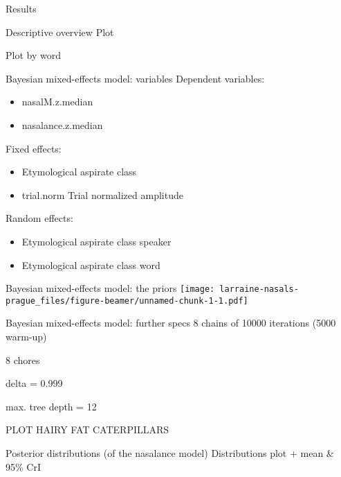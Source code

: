 \documentclass[
  ignorenonframetext,
]{beamer}
\begin{document}
\begin{frame}{Results}
\protect\hypertarget{results}{}
\begin{block}{Descriptive overview}
\protect\hypertarget{descriptive-overview}{}
Plot

Plot by word
\end{block}

\begin{block}{Bayesian mixed-effects model: variables}
\protect\hypertarget{bayesian-mixed-effects-model-variables}{}
Dependent variables:

\begin{itemize}
\item
  nasalM.z.median
\item
  nasalance.z.median
\end{itemize}

Fixed effects:

\begin{itemize}
\item
  Etymological aspirate class
\item
  trial.norm Trial normalized amplitude
\end{itemize}

Random effects:

\begin{itemize}
\item
  Etymological aspirate class \textbar{} speaker
\item
  Etymological aspirate class \textbar{} word
\end{itemize}
\end{block}

\begin{block}{Bayesian mixed-effects model: the priors}
\protect\hypertarget{bayesian-mixed-effects-model-the-priors}{}
\texttt{[image: larraine-nasals-prague\_files/figure-beamer/unnamed-chunk-1-1.pdf]}
\end{block}

\begin{block}{Bayesian mixed-effects model: further specs}
\protect\hypertarget{bayesian-mixed-effects-model-further-specs}{}
8 chains of 10000 iterations (5000 warm-up)

8 chores

delta = 0.999

max. tree depth = 12

PLOT HAIRY FAT CATERPILLARS
\end{block}

\begin{block}{Posterior distributions (of the nasalance model)}
\protect\hypertarget{posterior-distributions-of-the-nasalance-model}{}
Distributions plot + mean \& 95\% CrI
\end{block}
\end{frame}
\end{document}
